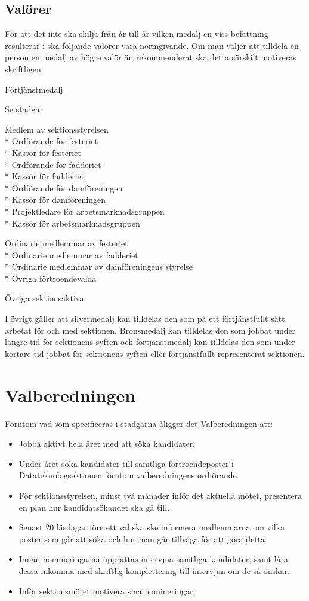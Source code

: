 \documentclass{datateknologsektionen-document}
\begin{document}
\subsection{Valörer}
För att det inte ska skilja från år till år vilken medalj en viss befattning resulterar i ska följande
valörer vara normgivande. Om man väljer att tilldela en person en medalj av högre valör än
rekommenderat ska detta särskilt motiveras skriftligen.
\begin{labeling}{Förtjänstmedalj}
  \item [Guld] Se stadgar
  \item [Silver] Medlem av sektionsstyrelsen\\*
  Ordförande för festeriet\\*
  Kassör för festeriet\\*
  Ordförande för fadderiet\\*
  Kassör för fadderiet\\*
  Ordförande för damföreningen\\*
  Kassör för damföreningen\\*
  Projektledare för arbetsmarknadsgruppen\\*
  Kassör för arbetsmarknadsgruppen
  \item [Brons] Ordinarie medlemmar av festeriet\\*
  Ordinarie medlemmar av fadderiet\\*
  Ordinarie medlemmar av damföreningens styrelse\\*
  Övriga förtroendevalda
  \item [Förtjänstmedalj] Övriga sektionsaktiva
\end{labeling}


I övrigt gäller att silvermedalj kan tilldelas den som på ett förtjänstfullt sätt arbetat för och med
sektionen. Bronsmedalj kan tilldelas den som jobbat under längre tid för sektionens syften och
förtjänstmedalj kan tilldelas den som under kortare tid jobbat för sektionens syften eller
förtjänstfullt representerat sektionen.
\section{Valberedningen}
\label{val}
Förutom vad som specificeras i stadgarna åligger det Valberedningen att:
\begin{itemize}
  \item Jobba aktivt hela året med att söka kandidater.
  \item Under året söka kandidater till samtliga förtroendeposter i Datateknologsektionen förutom valberedningens ordförande.
  \item För sektionsstyrelsen, minst två månader inför det aktuella mötet, presentera en plan hur kandidatsökandet ska gå till.
  \item Senast 20 läsdagar före ett val ska ske informera medlemmarna om vilka poster som går att söka och hur man går tillväga för att göra detta.
  \item Innan nomineringarna upprättas intervjua samtliga kandidater, samt låta dessa inkomma med skriftlig komplettering till intervjun om de så önskar.
  \item Inför sektionsmötet motivera sina nomineringar.
\end{itemize}
\end{document}
